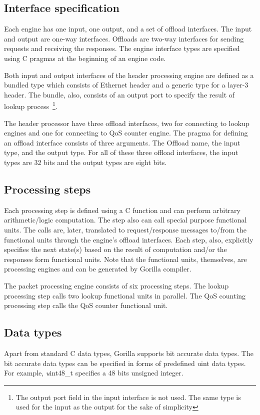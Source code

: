 \documentclass[a4paper, 12pt]{report}
\begin{document}


\subsection{Interface specification}
Each engine has one input, one output, and a set of 
offload interfaces. The input and output are one-way 
interfaces. Offloads are two-way interfaces for 
sending requests and receiving the responses.  
The engine interface types are specified using C 
pragmas at the beginning of an engine code. 

Both input and output interfaces of the header 
processing engine are defined as a bundled 
type which consists of Ethernet header and a 
generic type for a layer-3 header. The bundle, 
also, consists of an output port to specify the 
result of lookup process~\footnote{
The output port field in the input interface is 
not used. The same type is used for the input as 
the output for the sake of simplicity}.  

The header processor have three offload interfaces, 
two for connecting to lookup engines and one for 
connecting to QoS counter engine. The pragma for 
defining an offload interface consists of three 
arguments. The Offload name, the input type, and the 
output type. For all of these three offload interfaces, 
the input types are 32 bits and the output types are 
eight bits.
 
\subsection{Processing steps}
Each processing step is defined using a C function 
and can perform arbitrary arithmetic/logic computation. 
The step also can call special purpose functional units. 
The calls are, later, translated to request/response 
messages to/from the functional units through the engine's 
offload interfaces. Each step, also, explicitly specifies 
the next state(s) based on the result of computation and/or 
the responses form functional units. Note that the functional 
units, themselves, are processing engines and can be generated 
by Gorilla compiler.

The packet processing engine consists of six processing 
steps. The lookup processing step calls two lookup functional 
units in parallel. The QoS counting processing step calls the 
QoS counter functional unit.  

\subsection{Data types}
\label{sec:dataTypes}
Apart from standard C data types, Gorilla supports bit accurate 
data types. The bit accurate data types can be specified in forms 
of predefined {\emph uint} data types. For example, {\emph uint48\_t} 
specifies a 48 bits unsigned integer.
\end{document}
